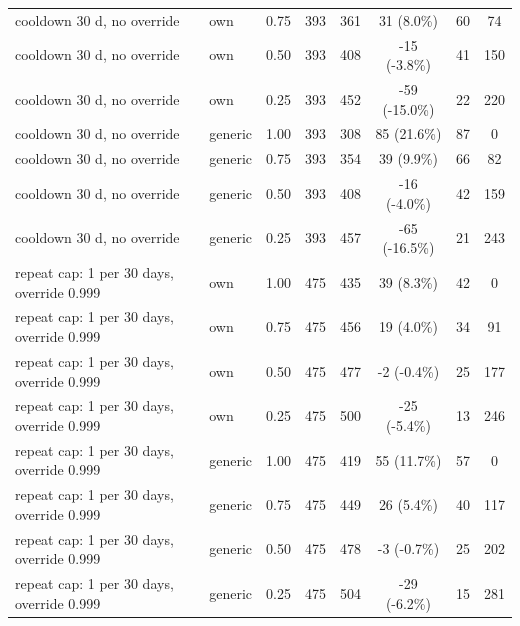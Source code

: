 \begin{table}[!t]
{\begin{tabular}{llcccccc}
cooldown 30 d, no override & own & 0.75 & 393 & 361 & 31 (8.0\%) & 60 & 74 \\
cooldown 30 d, no override & own & 0.50 & 393 & 408 & -15 (-3.8\%) & 41 & 150 \\
cooldown 30 d, no override & own & 0.25 & 393 & 452 & -59 (-15.0\%) & 22 & 220 \\
cooldown 30 d, no override & generic & 1.00 & 393 & 308 & 85 (21.6\%) & 87 & 0 \\
cooldown 30 d, no override & generic & 0.75 & 393 & 354 & 39 (9.9\%) & 66 & 82 \\
cooldown 30 d, no override & generic & 0.50 & 393 & 408 & -16 (-4.0\%) & 42 & 159 \\
cooldown 30 d, no override & generic & 0.25 & 393 & 457 & -65 (-16.5\%) & 21 & 243 \\
repeat cap: 1 per 30 days, override 0.999 & own & 1.00 & 475 & 435 & 39 (8.3\%) & 42 & 0 \\
repeat cap: 1 per 30 days, override 0.999 & own & 0.75 & 475 & 456 & 19 (4.0\%) & 34 & 91 \\
repeat cap: 1 per 30 days, override 0.999 & own & 0.50 & 475 & 477 & -2 (-0.4\%) & 25 & 177 \\
repeat cap: 1 per 30 days, override 0.999 & own & 0.25 & 475 & 500 & -25 (-5.4\%) & 13 & 246 \\
repeat cap: 1 per 30 days, override 0.999 & generic & 1.00 & 475 & 419 & 55 (11.7\%) & 57 & 0 \\
repeat cap: 1 per 30 days, override 0.999 & generic & 0.75 & 475 & 449 & 26 (5.4\%) & 40 & 117 \\
repeat cap: 1 per 30 days, override 0.999 & generic & 0.50 & 475 & 478 & -3 (-0.7\%) & 25 & 202 \\
repeat cap: 1 per 30 days, override 0.999 & generic & 0.25 & 475 & 504 & -29 (-6.2\%) & 15 & 281 \\
\bottomrule
\end{tabular}}
\end{table}


